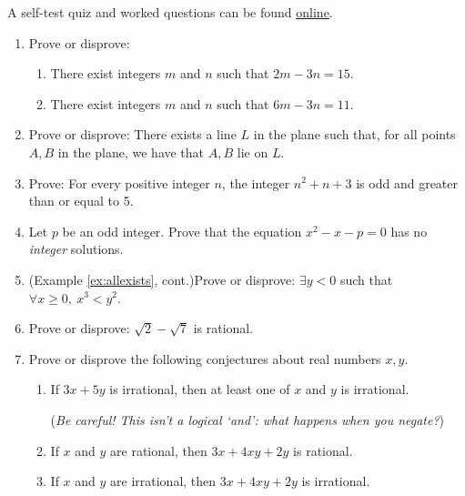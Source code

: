 \begin{exercises}{}{}
	A self-test quiz and worked questions can be found \href{http://www.math.uci.edu/~ndonalds/math13/selftest/2-4-proofs2.html}{online}.

	\begin{enumerate}
		\item Prove or disprove:
		\begin{enumerate}
		  \item There exist integers $m$ and $n$ such that $2m-3n=15$. 
		  
			\item There exist integers $m$ and $n$ such that $6m-3n=11$. 
	  \end{enumerate}
	   
	   
	  \item Prove or disprove: There exists a line $L$ in the plane such that, for all points $A,B$ in the plane, we have that $A,B$ lie on $L$. 
	   
	   
		\item Prove: For every positive integer $n$, the integer $n^2+n+3$ is odd and greater than or equal to 5.
		
	
		\item Let $p$ be an odd integer. Prove that the equation $x^2-x-p=0$ has no \emph{integer} solutions.
		
		
		\item (Example \ref{ex:allexists}, cont.)\lstsp Prove or disprove: $\exists y<0$ such that $\forall x\ge 0,\ x^3<y^2$.
		
		
		\item Prove or disprove: $\sqrt 2-\sqrt 7$ is rational.
	   
	   
		\item Prove or disprove the following conjectures about real numbers $x,y$.
		\begin{enumerate}
		  \item If $3x+5y$ is irrational, then at least one of $x$ and $y$ is irrational.\par
		  (\emph{Be careful! This isn't a logical `and': what happens when you negate?})
		  
		  \item If $x$ and $y$ are rational, then $3x+4xy+2y$ is rational.
		  
		  \item If $x$ and $y$ are irrational, then $3x+4xy+2y$ is irrational.
		\end{enumerate}
	  

\end{enumerate}
\end{exercises}
